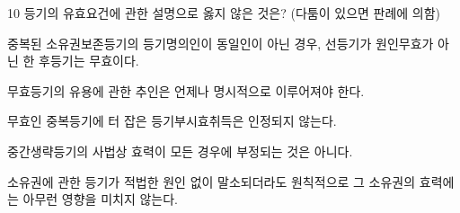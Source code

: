 \begin{question}{10}
등기의 유효요건에 관한 설명으로 옳지 않은 것은? (다툼이 있으면 판례에 의함)
\begin{choices}
  \item 중복된 소유권보존등기의 등기명의인이 동일인이 아닌 경우, 선등기가 원인무효가 아닌 한 후등기는 무효이다.
  \item 무효등기의 유용에 관한 추인은 언제나 명시적으로 이루어져야 한다.
  \item 무효인 중복등기에 터 잡은 등기부시효취득은 인정되지 않는다.
  \item 중간생략등기의 사법상 효력이 모든 경우에 부정되는 것은 아니다.
  \item 소유권에 관한 등기가 적법한 원인 없이 말소되더라도 원칙적으로 그 소유권의 효력에는 아무런 영향을 미치지 않는다.
\end{choices}
\end{question}
